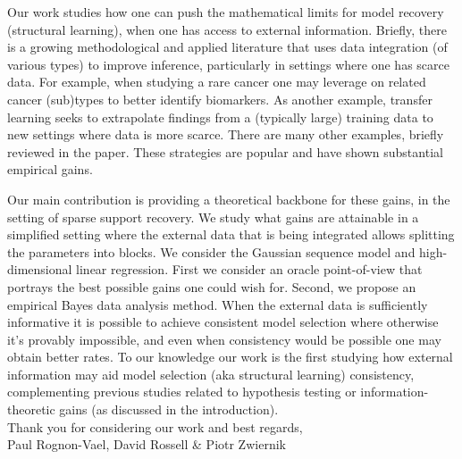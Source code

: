 \documentclass{imsart}
\theoremstyle{plain}
\begin{document}

Our work studies how one can push the mathematical limits for model recovery (structural learning), when one has access to external information. 
Briefly, there is a growing methodological and applied literature that uses data integration (of various types) to improve inference, particularly in settings where one has scarce data. For example, when studying a rare cancer one may leverage on related cancer (sub)types to better identify biomarkers. As another example, transfer learning seeks to extrapolate findings from a (typically large) training data to new settings where data is more scarce. There are many other examples, briefly reviewed in the paper.
These strategies are popular and have shown substantial empirical gains.

Our main contribution is providing a theoretical backbone for these gains, in the setting of sparse support recovery.
We study what gains are attainable %
in a simplified setting where the external data that is being integrated allows splitting %
the parameters into blocks. We consider the Gaussian sequence model and high-dimensional linear regression. First we consider an oracle point-of-view that portrays the best possible gains one could wish for. Second, we propose an empirical Bayes data analysis method. When the external data is sufficiently informative it is possible to achieve consistent model selection where otherwise it's provably impossible, and even when consistency would be possible one may obtain better rates. To our knowledge our work is the first studying how external information may aid model selection (aka structural learning) consistency, complementing previous studies related to hypothesis testing or information-theoretic gains (as discussed in the introduction).\\

Thank you for considering our work and best regards,\\

\noindent Paul Rognon-Vael, David Rossell \& Piotr Zwiernik
\end{document}
